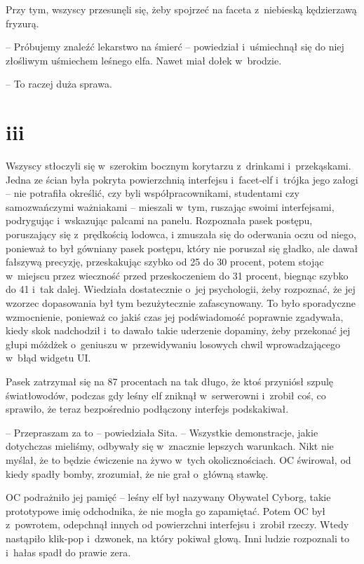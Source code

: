 \documentclass[oneside,polish,11pt,sfheadings]{mwbk}
\begin{document}
Przy tym, wszyscy przesunęli się, żeby spojrzeć na faceta z~niebieską
kędzierzawą fryzurą. 

-- Próbujemy znaleźć lekarstwo na śmierć -- powiedział i~uśmiechnął się do niej złośliwym uśmiechem leśnego elfa.
Nawet miał dołek w~brodzie. 

-- To raczej duża sprawa.

\chapter*{iii}

Wszyscy stłoczyli się w~szerokim bocznym korytarzu z~drinkami i~przekąskami. Jedna ze ścian była pokryta powierzchnią interfejsu i~facet-elf i~trójka jego załogi -- nie potrafiła określić, czy byli
współpracownikami, studentami czy samozwańczymi ważniakami -- mieszali w~tym, ruszając swoimi interfejsami, podrygując i~wskazując palcami na
panelu. Rozpoznała pasek postępu, poruszający się z~prędkością lodowca,
i zmuszała się do oderwania oczu od niego, ponieważ to był gówniany
pasek postępu, który nie poruszał się gładko, ale dawał fałszywą
precyzję, przeskakując szybko od 25 do 30 procent, potem stojąc w~miejscu przez wieczność przed przeskoczeniem do 31 procent, biegnąc
szybko do 41 i~tak dalej. Wiedziała dostatecznie o~jej psychologii, żeby
rozpoznać, że jej wzorzec dopasowania był tym bezużytecznie
zafascynowany. To było sporadyczne wzmocnienie, ponieważ co jakiś czas
jej podświadomość poprawnie zgadywała, kiedy skok nadchodził i~to dawało
takie uderzenie dopaminy, żeby przekonać jej głupi móżdżek o~geniuszu w~przewidywaniu losowych chwil wprowadzającego w~błąd widgetu UI.

Pasek zatrzymał się na 87 procentach na tak długo, że ktoś przyniósł
szpulę światłowodów, podczas gdy leśny elf zniknął w~serwerowni i~zrobił
coś, co sprawiło, że teraz bezpośrednio podłączony interfejs
podskakiwał.

-- Przepraszam za to -- powiedziała Sita. -- Wszystkie demonstracje, jakie
dotychczas mieliśmy, odbywały się w~znacznie lepszych warunkach. Nikt
nie myślał, że to będzie ćwiczenie na żywo w~tych okolicznościach. OC
świrował, od kiedy spadły bomby, zrozumiał, że nie grał o~główną stawkę.

OC podrażniło jej pamięć -- leśny elf był nazywany Obywatel Cyborg, takie
prototypowe imię odchodnika, że nie mogła go zapamiętać. Potem OC był z~powrotem, odepchnął innych od powierzchni interfejsu i~zrobił rzeczy.
Wtedy nastąpiło klik-pop i~dzwonek, na który pokiwał głową. Inni ludzie
rozpoznali to i~hałas spadł do prawie zera.
\end{document}

